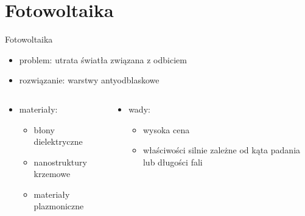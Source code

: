 \documentclass{beamer}
\begin{document}
\section{Fotowoltaika}

\begin{frame}{Fotowoltaika}
    \begin{itemize}
        \item problem: utrata światła związana z odbiciem
        \item rozwiązanie: warstwy antyodblaskowe
    \end{itemize}
    \begin{columns}
        \begin{column}{0.5\textwidth}
            \begin{itemize}
            \item materiały:
            \begin{itemize}
                \item błony dielektryczne
                \item nanostruktury krzemowe
                \item materiały plazmoniczne
            \end{itemize}
            \end{itemize}
        \end{column}
        \begin{column}{0.5\textwidth}
            \begin{itemize}
            \item wady:
            \begin{itemize}
                \item wysoka cena
                \item właściwości silnie zależne od kąta padania lub długości fali
            \end{itemize}
            \end{itemize}
        \end{column}
    \end{columns}
\end{frame}
\end{document}
